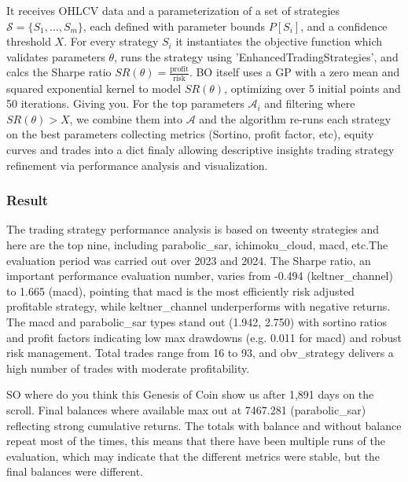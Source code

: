 It receives OHLCV data and a parameterization of a set of strategies \(\mathcal{S} = \{ S_1, \ldots, S_m \}\), each defined with parameter bounds \(P[S_i]\), and a confidence threshold \(X\). For every strategy \(S_i\) it instantiates the objective function which validates parameters \(\theta\), runs the strategy using 'EnhancedTradingStrategies', and calcs the Sharpe ratio  \(SR(\theta) = \frac{\text{profit}}{\text{risk}}\). BO itself uses a GP with a zero mean and squared exponential kernel to model \(SR(\theta)\), optimizing over 5 initial points and 50 iterations. Giving you. For the top parameters \(\mathcal{A}_i\) and filtering where \(SR(\theta) > X\), we combine them into \(\mathcal{A}\) and the algorithm re-runs each strategy on the best parameters collecting metrics (Sortino, profit factor, etc), equity curves and trades into a dict finaly allowing descriptive insights trading strategy refinement via performance analysis and visualization.

\subsubsection{Result}
The trading strategy performance analysis is based on tweenty strategies and here are the top nine, including parabolic\_sar, ichimoku\_cloud, macd, etc.The evaluation period was carried out over 2023 and 2024. The Sharpe ratio, an important performance evaluation number, varies from -0.494 (keltner\_channel) to 1.665 (macd), pointing that macd is the most efficiently risk adjusted profitable strategy, while keltner\_channel underperforms with negative returns. The macd and parabolic\_sar types stand out (1.942, 2.750) with sortino ratios and profit factors indicating low max drawdowns (e.g. 0.011 for macd) and robust risk management. Total trades range from 16 to 93, and obv\_strategy delivers a high number of trades with moderate profitability. 

SO where do you think this Genesis of Coin show us after 1,891 days on the scroll. Final balances where available max out at 7467.281 (parabolic\_sar) reflecting strong cumulative returns. The totals with balance and without balance repeat most of the times, this means that there have been multiple runs of the evaluation, which may indicate that the different metrics were stable, but the final balances were different.

